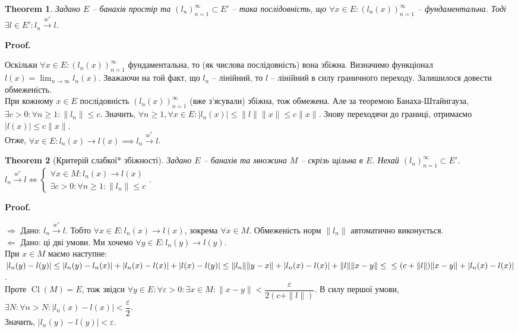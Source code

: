 \documentclass[a4paper, 10pt]{article}
\makeatletter
\def\rightproof{$\boxed{\Rightarrow}$ }
\def\leftproof{$\boxed{\Leftarrow}$ }
\theoremstyle{theoremdd}
\newtheorem{theorem}{Theorem}[subsection]
\theoremstyle{theoremdd}
\theoremstyle{theoremdd}
\theoremstyle{theoremdd}
\theoremstyle{theoremdd}
\theoremstyle{theoremdd}
\theoremstyle{theoremdd}
\theoremstyle{theoremdd}
\newcommand{\toweakstar}{\overset{w^*}{\to}}
\renewenvironment{proof}[1][Proof.\\]{\par
\pushQED{\hfill \qed}%
\normalfont \topsep6\p@\@plus6\p@\relax
\trivlist
\item\relax
{\bfseries
#1\@addpunct{.}}\hspace\labelsep\ignorespaces
}{%
\popQED\endtrivlist\@endpefalse
}
\DeclareMathOperator{\Cl}{Cl}
\makeatother
\begin{document}
\begin{theorem}
Задано $E$ -- банахів простір та $(l_n)_{n=1}^\infty \subset E'$ -- така послідовність, що $\forall x \in E: (l_n(x))_{n=1}^\infty$ -- фундаментальна. Тоді $\exists l \in E': l_n \toweakstar l$.
\end{theorem}

\begin{proof}
Оскільки $\forall x \in E: (l_n(x))_{n=1}^\infty$ фундаментальна, то (як числова послідовність) вона збіжна. Визначимо функціонал $l(x) = \displaystyle\lim_{n \to \infty} l_n(x)$. Зважаючи на той факт, що $l_n$ -- лінійний, то $l$ -- лінійний в силу граничного переходу. Залишилося довести обмеженість.\\
При кожному $x \in E$ послідовність $(l_n(x))_{n=1}^\infty$ (вже з'ясували) збіжна, тож обмежена. Але за теоремою Банаха-Штайнгауза, $\exists c > 0: \forall n \geq 1: \|l_n\| \leq c$. Значить, $\forall n \geq 1, \forall x \in E: |l_n(x)| \leq \|l\| \|x\| \leq c \|x\|$. Знову переходячи до границі, отримаємо $|l(x)| \leq c \|x\|$.\\
Отже, $\forall x \in E: l_n(x) \to l(x) \implies l_n \toweakstar l$. 
\end{proof}

\begin{theorem}[Критерій слабкої* збіжності]
Задано $E$ -- банахів та множина $M$ -- скрізь щільна в $E$. Нехай $(l_n)_{n=1}^\infty \subset E'$.\\
$l_n \toweakstar l \iff \begin{cases} \forall x \in M: l_n(x) \to l(x) \\ \exists c > 0: \forall n \geq 1: \|l_n\| \leq c \end{cases}$.
\end{theorem}

\begin{proof}
\rightproof Дано: $l_n \toweakstar l$. Тобто $\forall x \in E: l_n(x) \to l(x)$, зокрема $\forall x \in M$. Обмеженість норм $\|l_n\|$ автоматично виконується.
\bigskip \\
\leftproof Дано: ці дві умови. Ми хочемо $\forall y \in E: l_n(y) \to l(y)$.\\
При $x \in M$ маємо наступне:\\
$|l_n(y) - l(y)| \leq |l_n(y) - l_n(x)| + |l_n(x) - l(x)| + |l(x) - l(y)| \leq \| l_n \| \| y - x \| + |l_n(x) - l(x)| + \|l\| \|x-y\| \leq \\
\leq (c + \|l\|) \|x-y\| + |l_n(x) - l(x)|$.\\
Проте $\Cl(M) = E$, тож звідси $\forall y \in E: \forall \varepsilon > 0: \exists x \in M: \|x-y\| < \dfrac{\varepsilon}{2(c+ \|l\|)}$. В силу першої умови, $\exists N: \forall n > N: |l_n(x) - l(x)| < \dfrac{\varepsilon}{2}$.\\
Значить, $|l_n(y) - l(y)| < \varepsilon$.
\end{proof}
\end{document}
